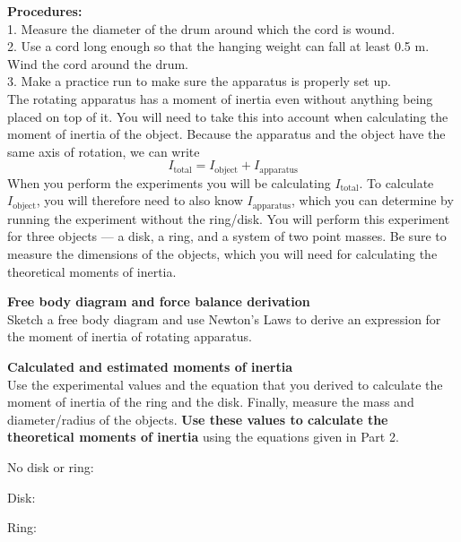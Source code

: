 \documentclass[11pt,letterpaper]{article}
\begin{document}
{\bf Procedures:}\\  
1.  Measure the diameter of the drum around which
the cord is wound.\\
2.  Use a cord long enough so that the hanging weight can fall at least
0.5 m.  Wind the cord around the drum.\\
3.  Make a practice run to make sure the apparatus is properly
set up.\\

The rotating apparatus has a moment of inertia even without anything being placed on top of it. You will need to take this into account when calculating the moment of inertia of the object. Because the apparatus and the object have the same axis of rotation, we can write
$$I_{\mbox{total}}=I_{\mbox{object}}+I_{\mbox{apparatus}}$$
When you perform the experiments you will be calculating $I_{\mbox{total}}$. To calculate $I_{\mbox{object}}$, you will therefore need to also know $I_{\mbox{apparatus}}$, which you can determine by running the experiment without the ring/disk. You will perform this experiment for three objects --- a disk, a ring, and a system of two point masses.  Be sure to measure the dimensions of the objects, which you will need for calculating the theoretical moments of inertia.\bigskip

{\bf Free body diagram and force balance derivation}\\
Sketch a free body diagram and use Newton's Laws to derive an expression for the moment of inertia of rotating apparatus.

\clearpage
{\bf Calculated and estimated moments of inertia}\\
Use the experimental values and the equation that you derived to calculate
the moment of inertia of the ring and the disk.
Finally, measure the mass and diameter/radius of the objects. \textbf{Use these values to calculate the theoretical moments of inertia} using the equations given in Part 2.

No disk or ring:\\
\vspace{6cm}

Disk:\\
\vspace{6cm}

Ring:\\
\vspace{6cm}
\end{document}
